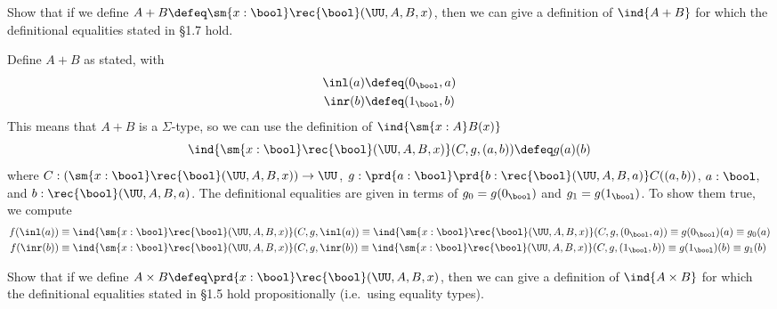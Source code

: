   Show that if we define $A + B \defeq \sm{x:\bool}
\rec{\bool}(\UU, A, B, x)$, then we can give a definition of $\ind{A+B}$ for
which the definitional equalities stated in \S1.7 hold.

\soln  Define $A+B$ as stated, with
\begin{align*}
  \inl(a) &\defeq (0_{\bool}, a) \\
  \inr(b) &\defeq (1_{\bool}, b)
\end{align*} 
This means that $A+B$ is a $\Sigma$-type, so we
can use the definition of $\ind{\sm{x:A}B(x)}$
\[
  \ind{\sm{x:\bool}\rec{\bool}(\UU, A, B, x)}(C, g, (a, b)) 
  \defeq g(a)(b)
\]
where $C : (\sm{x:\bool}\rec{\bool}(\UU, A, B, x)) \to \UU$, $g :
\prd{a:\bool}\prd{b:\rec{\bool}(\UU, A, B, a)}C((a, b))$, $a : \bool$, and $b :
\rec{\bool}(\UU, A, B, a)$.
The definitional equalities are given in terms of $g_{0} = g(0_{\bool})$ and
$g_{1} = g(1_{\bool})$.
To show them true, we compute
\begin{align*}
  f(\inl(a))
  &\equiv
  \ind{\sm{x:\bool}\rec{\bool}(\UU, A, B, x)}(C, g, \inl(a)) 
  \equiv
  \ind{\sm{x:\bool}\rec{\bool}(\UU, A, B, x)}(C, g, (0_{\bool}, a)) 
  \equiv
  g(0_{\bool})(a)
  \equiv
  g_{0}(a) 
  \\
  f(\inr(b))
  &\equiv
  \ind{\sm{x:\bool}\rec{\bool}(\UU, A, B, x)}(C, g, \inr(b)) 
  \equiv
  \ind{\sm{x:\bool}\rec{\bool}(\UU, A, B, x)}(C, g, (1_{\bool}, b)) 
  \equiv
  g(1_{\bool})(b)
  \equiv
  g_{1}(b) 
\end{align*}

  Show that if we define $A \times B \defeq \prd{x : \bool}
\rec{\bool}(\UU, A, B, x)$, then we can give a definition of $\ind{A \times
  B}$ for which the definitional equalities stated in \S1.5 hold
propositionally (i.e.~using equality types).


